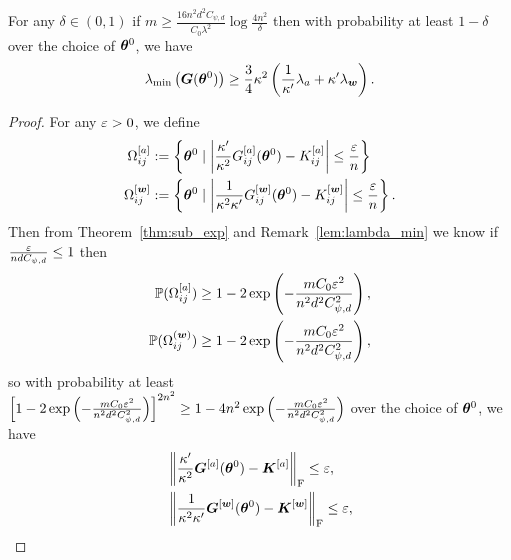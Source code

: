 \documentclass{article}
\begin{document}
\begin{lem}\label{lem:lambda_min}
    For any $\delta\in(0,1)$ if $m\geq\frac{16n^2d^2C_{\psi,d}}{C_0\lambda^2}\log\frac{4n^2}{\delta}$ then with probability at least $1-\delta$ over the choice of $\bm{\theta}^0$, we have
    \begin{equation}
        \lambda_{\min}\left(\bm{G}(\bm{\theta}^0)\right)\geq\frac{3}{4}\kappa^2\left(\frac{1}{\kappa'}\lambda_a+\kappa'\lambda_{\bm{w}}\right).
    \end{equation}
\end{lem}
\begin{proof}
    For any $\varepsilon > 0$, we define
    \begin{equation}
        \begin{aligned}
            \Omega_{ij}^{[a]}   & :=\left\{\bm{\theta}^0 \mid \left\lvert \frac{\kappa'}{\kappa^2}G^{[a]}_{ij}(\bm{\theta}^0) - K^{[a]}_{ij}\right\rvert \leq \frac{\varepsilon}{n} \right\}        \\
            \Omega_{ij}^{[\bm{w}]} & := \left\{\bm{\theta}^0 \mid \left\lvert \frac{1}{\kappa^2\kappa'}G^{[\bm{w}]}_{ij}(\bm{\theta}^0) - K^{[\bm{w}]}_{ij}\right\rvert \leq \frac{\varepsilon}{n} \right\}.
        \end{aligned}
    \end{equation}
    Then from Theorem~\ref{thm:sub_exp} and Remark~\ref{lem:lambda_min} we know if $\frac{\varepsilon}{ndC_{\psi,d}}\leq 1$ then
    \begin{equation}
        \begin{aligned}
            \mathbb{P}(\Omega^{[a]}_{ij})   & \geq 1-2\exp\left(-\frac{mC_0\varepsilon^2}{n^2d^2C_{\psi,d}^2}\right), \\
            \mathbb{P}(\Omega^{(\bm{w})}_{ij}) & \geq 1-2\exp\left(-\frac{mC_0\varepsilon^2}{n^2d^2C_{\psi,d}^2}\right),
        \end{aligned}
    \end{equation}
    so with probability at least $\left[1-2\exp\left(-\frac{mC_0\varepsilon^2}{n^2d^2C_{\psi,d}^2}\right)\right]^{2n^2} \geq 1-4n^2\exp\left(-\frac{mC_0\varepsilon^2}{n^2d^2C_{\psi,d}^2}\right)$ over the choice of $\bm{\theta}^0$, we have
    \begin{equation}
        \begin{aligned}
             & \left\lVert\frac{\kappa'}{\kappa^2}\bm{G}^{[a]}(\bm{\theta}^0) - \bm{K}^{[a]}\right\rVert_\mathrm{F} \leq \varepsilon,      \\
             & \left\lVert\frac{1}{\kappa^2\kappa'}\bm{G}^{[\bm{w}]}(\bm{\theta}^0) - \bm{K}^{[\bm{w}]}\right\rVert_\mathrm{F} \leq \varepsilon,
        \end{aligned}
    \end{equation}

\end{proof}
\end{document}
